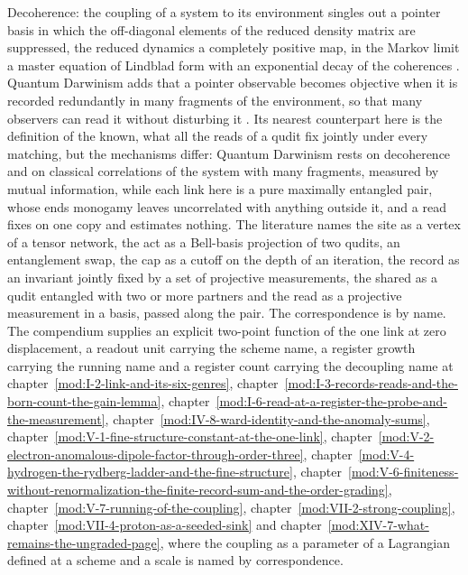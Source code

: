 \begin{chbridge}Decoherence: the coupling of a system to its environment singles out a pointer basis in which the off-diagonal elements of the reduced density matrix are suppressed, the reduced dynamics a completely positive map, in the Markov limit a master equation of Lindblad form with an exponential decay of the coherences \cite{Zurek1981,Lindblad1976}. Quantum Darwinism adds that a pointer observable becomes objective when it is recorded redundantly in many fragments of the environment, so that many observers can read it without disturbing it \cite{OllivierPoulinZurek2004,Zurek2009}. Its nearest counterpart here is the definition of the known, what all the reads of a qudit fix jointly under every matching, but the mechanisms differ: Quantum Darwinism rests on decoherence and on classical correlations of the system with many fragments, measured by mutual information, while each link here is a pure maximally entangled pair, whose ends monogamy leaves uncorrelated with anything outside it, and a read fixes on one copy and estimates nothing. The literature names the site as a vertex of a tensor network, the act as a Bell-basis projection of two qudits, an entanglement swap, the cap as a cutoff on the depth of an iteration, the record as an invariant jointly fixed by a set of projective measurements, the shared as a qudit entangled with two or more partners and the read as a projective measurement in a basis, passed along the pair. The correspondence is by name. The compendium supplies an explicit two-point function of the one link at zero displacement, a readout unit carrying the scheme name, a register growth carrying the running name and a register count carrying the decoupling name at chapter~\ref{mod:I-2-link-and-its-six-genres}, chapter~\ref{mod:I-3-records-reads-and-the-born-count-the-gain-lemma}, chapter~\ref{mod:I-6-read-at-a-register-the-probe-and-the-measurement}, chapter~\ref{mod:IV-8-ward-identity-and-the-anomaly-sums}, chapter~\ref{mod:V-1-fine-structure-constant-at-the-one-link}, chapter~\ref{mod:V-2-electron-anomalous-dipole-factor-through-order-three}, chapter~\ref{mod:V-4-hydrogen-the-rydberg-ladder-and-the-fine-structure}, chapter~\ref{mod:V-6-finiteness-without-renormalization-the-finite-record-sum-and-the-order-grading}, chapter~\ref{mod:V-7-running-of-the-coupling}, chapter~\ref{mod:VII-2-strong-coupling}, chapter~\ref{mod:VII-4-proton-as-a-seeded-sink} and chapter~\ref{mod:XIV-7-what-remains-the-ungraded-page}, where the coupling as a parameter of a Lagrangian defined at a scheme and a scale is named by correspondence.\end{chbridge}
